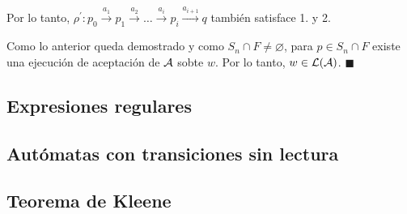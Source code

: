 Por lo tanto, $\rho^{\prime}: p_0 \stackrel{a_1}{\rightarrow} p_1 \stackrel{a_2}{\rightarrow} \ldots \stackrel{a_i}{\rightarrow} p_i \stackrel{a_{i+1}}{\rightarrow} q$ también satisface 1. y 2. \medbreak

Como lo anterior queda demostrado y como $S_n \cap F \neq \varnothing$, para $p \in S_n \cap F$ existe una ejecución de aceptación de $\mathcal{A}$ sobte $w$. Por lo tanto, $w \in \mathcal{L}(\mathcal{A})$. \hfill $\blacksquare$



\subsection{Expresiones regulares}

\subsection{Autómatas con transiciones sin lectura}

\subsection{Teorema de Kleene}